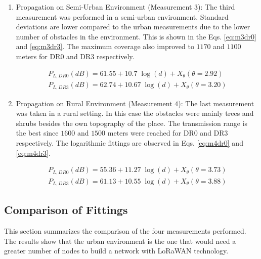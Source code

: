 \begin{enumerate}
\item Propagation on Semi-Urban Environment (Measurement $3$): The third measurement was performed in a semi-urban environment. Standard deviations are lower compared to the urban measurements due to the lower number of obstacles in the environment. This is shown in the Eqs. \eqref{eq:m3dr0} and \eqref{eq:m3dr3}. The maximum coverage also improved to $1170$ and $1100$ meters for DR$0$ and DR$3$ respectively.

\begin{eqnarray}
P_{L,DR0}(dB) = 61.55+10.7\;\log(d)+X_\theta(\theta=2.92) \label{eq:m3dr0} \\
P_{L,DR3}(dB) = 62.74+10.67\;\log(d)+X_\theta(\theta=3.20) \label{eq:m3dr3}
\end{eqnarray}

\item Propagation on Rural Environment (Measurement $4$): The last measurement was taken in a rural setting. In this case the obstacles were mainly trees and shrubs besides the own topography of the place. The transmission range is the best since $1600$ and $1500$ meters were reached for DR$0$ and DR$3$ respectively. The logarithmic fittings are observed in Eqs. \eqref{eq:m4dr0} and \eqref{eq:m4dr3}.

\begin{eqnarray} 
P_{L,DR0}(dB) = 55.36+11.27\;\log(d)+X_\theta(\theta=3.73) \label{eq:m4dr0} \\
P_{L,DR3}(dB) = 61.13+10.55\;\log(d)+X_\theta(\theta=3.88) \label{eq:m4dr3}
\end{eqnarray}

\end{enumerate}

\subsection{Comparison of Fittings}
\label{sub:compfittings}
This section summarizes the comparison of the four measurements performed. The results show that the urban environment is the one that would need a greater number of nodes to build a network with LoRaWAN technology.

